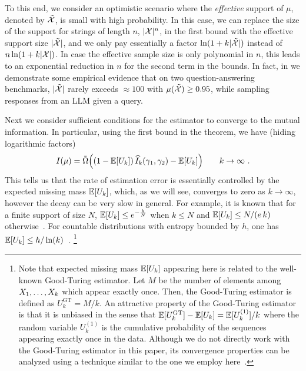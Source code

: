 \documentclass[a4paper]{article}
\theoremstyle{plain}
\theoremstyle{definition}
\theoremstyle{plain}
\begin{document}
To this end, we consider an optimistic scenario where the \emph{effective} support of $\mu$, denoted by $\tilde {{\mathcal{X}}}$, is small with high probability.
In this case, we can replace the size of the support for strings of length $n$, $|{\mathcal{X}}|^n$, in the first bound with the effective support size $|\tilde{{\mathcal{X}}}|$, and we only pay essentially a factor $\ln(1+k|\tilde {{\mathcal{X}}}|)$ instead of $n \ln(1+k|{\mathcal{X}}|)$. In case the effective sample size is only polynomial in $n$, this leads to an exponential reduction in $n$ for the second term in the bounds.
In fact, in  we demonstrate some empirical evidence that on two question-answering benchmarks, $|\tilde {{\mathcal{X}}}|$ rarely exceeds $\approx 100$ with $\mu(\tilde {{\mathcal{X}}}) \geq 0.95$,
while sampling responses from an LLM given a query.

Next we consider sufficient conditions for the estimator to converge to the mutual information.
%
In particular, using the first bound in the theorem, we have (hiding logarithmic factors)
\begin{align*}
  I(\mu) = \tilde{\Omega}\Big( (1-\mathbb{E}[U_k]) \, \widehat I_k(\gamma_1, \gamma_2) - \mathbb{E}[U_k] \Big) \qquad k \to \infty~.
\end{align*}
%
This tells us that the rate of estimation error is essentially controlled by the
expected missing mass $\mathbb{E}[U_k]$, which, as we will see, converges to zero as $k \to \infty$, however the decay can be very slow in general.
For example, it is known that for a finite support of size $N$,
$\mathbb{E}[U_k] \leq e^{-\frac{k}{N}}$ when $k \leq N$ and $\mathbb{E}[U_k] \leq N / (e \, k)$ otherwise~\citep{berend2012missing}.
For countable distributions with entropy bounded by $h$, one has $\mathbb{E}[U_k] \leq h / \ln(k)$~\citep{berend2017expected}.%
\footnote{Note that expected missing mass $\mathbb{E}[U_k]$ appearing here is related to the well-known Good-Turing estimator.  Let $M$ be
the number of elements among $X_1, \ldots, X_k$ which appear exactly
once.  Then, the Good-Turing estimator is defined as $U^{\text{GT}}_k = M / k$.
An attractive property of the Good-Turing estimator is that it is unbiased in
the sense that $\mathbb{E}[U^{\text{GT}}_k] - \mathbb{E}[U_k] = \mathbb{E}[U_k^{(1)}]/k$ where the random variable
$U_k^{(1)}$ is the cumulative probability of the sequences appearing exactly once in the data.
Although we do not directly work with the Good-Turing
estimator in this paper, its convergence properties can be analyzed 
using a technique similar to the one we employ here~\citep{berend2012missing}.}
\end{document}
